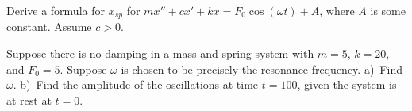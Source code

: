 \begin{exercise}
Derive a formula for $x_{sp}$ for
$mx''+cx'+kx = F_0 \cos(\omega t) + A$,
where $A$ is some constant.  Assume $c > 0$.
\end{exercise}

\begin{exercise}
Suppose there is no damping in a mass and spring system with
$m = 5$, $k= 20$, and $F_0 = 5$.  Suppose $\omega$ is chosen
to be precisely the resonance frequency.  a)~Find $\omega$.  b)~Find
the amplitude of the oscillations at time $t=100$, given the system is at
rest at $t=0$.
\end{exercise}
